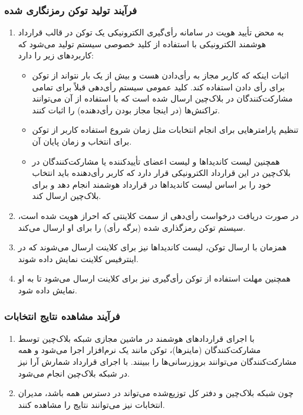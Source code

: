 \documentclass[12pt]{article}
\begin{document}
\subsubsection{فرآیند تولید توکن رمزنگاری شده}
\begin{enumerate}[label=(\arabic*)]
\item
به محض تأیید هویت در سامانه رأی‌گیری الکترونیکی یک توکن در قالب قرارداد هوشمند الکترونیکی با استفاده از کلید خصوصی سیستم  تولید می‌شود که کاربردهای زیر را دارد:
\begin{itemize}
\item
اثبات اینکه که کاربر مجاز به رأی‌دادن هست و بیش از یک بار نتواند از توکن برای رأی دادن استفاده کند. کلید عمومی سیستم رأی‌دهی قبلاً برای تمامی مشارکت‌کنند‌گان در بلاک‌چین ارسال شده است که با استفاده از آن می‌توانند تراکنش‌ها (در اینجا مجاز بودن رأی‌دهنده) را اثبات کنند. 
\item
تنظیم پارامترهایی برای انجام انتخابات مثل زمان شروع استفاده کاربر از توکن برای انتخاب و زمان پایان آن. 
\item
همچنین لیست کاندیداها و لیست اعضای تأییدکننده 
یا مشارکت‌کنندگان در بلاک‌چین در این قرارداد الکترونیکی قرار دارد که کاربر رأی‌دهنده باید انتخاب خود را بر اساس لیست کاندیداها در قرارداد هوشمند انجام دهد و برای بلاک‌چین ارسال کند. 
\end{itemize}
\item
در صورت دریافت درخواست رأی‌دهی از سمت کلاینتی که احراز هویت شده است، سیستم توکن رمزگذاری شده (برگه رأی) را برای او ارسال می‌کند. 
\item
همزمان با ارسال توکن، لیست کاندیداها نیز برای کلاینت ارسال می‌شوند که در اینترفیس کلاینت نمایش داده شوند. 
\item
همچنین مهلت استفاده از توکن رأی‌گیری نیز برای کلاینت ارسال می‌شود تا به او نمایش داده شود. 
\end{enumerate}



\subsubsection{فرآیند مشاهده نتایج انتخابات}
\begin{enumerate}[label=(\arabic*)]
\item
با اجرای قراردادهای هوشمند در ماشین مجازی شبکه بلاک‌چین توسط مشارکت‌کنند‌گان (ماینرها)، توکن مانند یک نرم‌افزار اجرا می‌شود و همه مشارکت‌کنند‌گان می‌توانند بروزرسانی‌ها را ببینند. با اجرای قرارداد شمارش آرا نیز در شبکه بلاک‌چین انجام می‌شود.  
\item
چون شبکه بلاک‌چین و دفتر کل توزیع‌شده می‌تواند در دسترس همه باشد، مدیران انتخابات نیز می‌توانند نتایج را مشاهده کنند. 
\end{enumerate}
\end{document}
